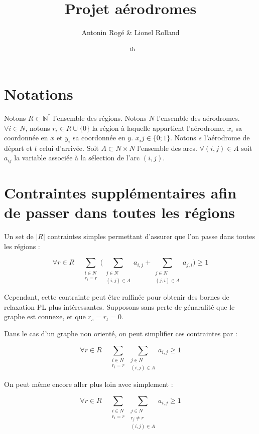 \documentclass[12pt,a4paper]{article}
\title{Projet aérodromes}
\author{Antonin Rogé \& Lionel Rolland}
\date{\monthname \ \the\day\textsuperscript{th} \the\year}
\begin{document}
\maketitle

\newpage

\tableofcontents

\newpage

\section{Notations}

Notons $R \subset \mathbb{N}^*$ l'ensemble des régions.
Notons $N$ l'ensemble des aérodromes. $\forall i \in N$, notons $r_i \in R \cup \{0\}$ la région
à laquelle appartient l'aérodrome, $x_i$ sa coordonnée en $x$ et $y_i$ sa
coordonnée en $y$. $x_ij \in \{0; 1\}$. Notons $s$ l'aérodrome de départ et $t$ celui d'arrivée.
Soit $A \subset N \times N$ l'ensemble des arcs. $\forall (i,j) \in A$ soit
$a_{ij}$ la variable associée à la sélection de l'arc $(i, j)$.

\section{Contraintes supplémentaires afin de passer dans toutes les régions}

Un set de $|R|$ contraintes simples permettant d'assurer que l'on passe dans toutes les régions :

$$\forall r \in R \quad \sum_{\substack{i \in N \\ r_i = r}}
\Big(\sum_{\substack{j \in N \\ (i, j) \in A}} a_{i, j} + \sum_{\substack{j \in N \\ (j, i) \in A}} a_{j, i} \Big) \geq 1$$

Cependant, cette contrainte peut être raffinée pour obtenir des bornes de relaxation PL plus intéressantes.
Supposons sans perte de génaralité que le graphe est connexe, et que $r_s = r_t = 0$.

Dans le cas d'un graphe non orienté, on peut simplifier ces contraintes par :

$$\forall r \in R \quad \sum_{\substack{i \in N \\ r_i = r}} \sum_{\substack{j \in N \\ (i, j) \in A}} a_{i, j} \geq 1$$

On peut même encore aller plus loin avec simplement :

$$\forall r \in R \quad \sum_{\substack{i \in N \\ r_i = r}} \sum_{\substack{j \in N \\ r_j \neq r \\ (i, j) \in A}} a_{i, j} \geq 1$$
\end{document}
